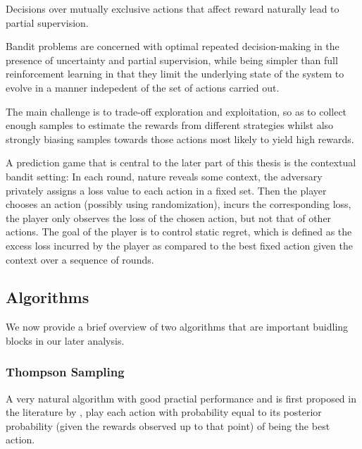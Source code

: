 Decisions over mutually exclusive actions that affect reward naturally lead to partial supervision.

Bandit problems are concerned with optimal repeated decision-making in the presence of uncertainty and partial supervision, while being simpler than full reinforcement learning in that they limit the underlying state of the system to evolve in a manner indepedent of the set of actions carried out. 


The main challenge is to trade-off exploration and exploitation, so as to collect enough samples to estimate the rewards from different strategies whilst also strongly biasing samples towards those actions most likely to yield high rewards.  

 A prediction game that is central to the later part of this thesis is the contextual bandit setting: In each round, nature reveals some context, the adversary privately assigns a loss value to each action in a fixed set.
 Then the player chooses an action (possibly using randomization), incurs the corresponding loss, the player only observes the loss of the chosen action, but not that of other actions.
 The goal of the player is to control static regret, which is defined as the excess loss incurred by the player as compared to the best fixed action given the context over a sequence of rounds.



\subsection{Algorithms}

We now provide a brief overview of two algorithms that are important buidling blocks in our later analysis. 

\subsubsection{Thompson Sampling}

 A very natural algorithm with good practial performance and is first proposed in the literature by \cite{thompson:33}, play each action with probability equal to its posterior probability (given the rewards observed up to that point) of being the best action.



